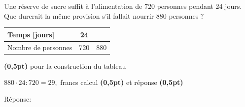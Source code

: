 
\question[2]
Une réserve de sucre suffit à l'alimentation de 720 personnes pendant 24 jours. Que durerait la même provision s'il fallait nourrir 880 personnes ?

\vspace{10pt}{\footnotesize\raggedleft Espace pour ta démarche et tes calculs\par}
\begin{solutionorgrid}[140pt]

\vspace{5pt}
\def\arraystretch{1.5}
\begin{tabularx}{0.5\textwidth}{l|C|C|}
Temps [jours]&24&\\
\hline
Nombre de personnes&720&880\\
\end{tabularx}
\def\arraystretch{1}

\hfill\textbf{(0,5pt)} pour la construction du tableau

\vspace{15pt}$880 \cdot 24 : 720 = 29,$ francs \hfill calcul \textbf{(0,5pt)} et réponse \textbf{(0,5pt)}
\end{solutionorgrid}

\begin{tcolorbox}[enhanced jigsaw, interior hidden, colframe=box, parbox=false]%
Réponse: 
\sol{\vspace{20pt}}{\textbf{(0.5pt)}}
\end{tcolorbox}



